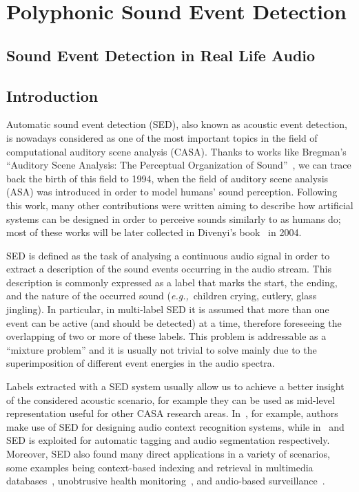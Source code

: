 \chapter{Polyphonic Sound Event Detection}
\section{Sound Event Detection in Real Life Audio}

\section{Introduction}
\label{sec:intro}


Automatic sound event detection (SED), also known as acoustic event detection, is nowadays considered as one of the most important topics in the field of computational auditory scene analysis (CASA). Thanks to works like Bregman's ``Auditory Scene Analysis: The Perceptual Organization of Sound''~\cite{bregman1994auditory}, we can trace back the birth of this field to 1994, when the field of auditory scene analysis (ASA) was introduced in order to model humans' sound perception. Following this work, many other contributions were written aiming to describe how artificial systems can be designed in order to perceive sounds similarly to as humans do; most of these works will be later collected in Divenyi's book~\cite{divenyi2004speech} in 2004.

SED is defined as the task of analysing a continuous audio signal in order to extract a description of the sound events occurring in the audio stream. This description is commonly expressed as a label that marks the start, the ending, and the nature of the occurred sound (\emph{e.g.,}\ children crying, cutlery, glass jingling). In particular, in multi-label SED it is assumed that more than one event can be active (and should be detected) at a time, therefore foreseeing the overlapping of two or more of these labels. This problem is addressable as a ``mixture problem'' and it is usually not trivial to solve mainly due to the superimposition of different event energies in the audio spectra.

Labels extracted with a SED system usually allow us to achieve a better insight of the considered acoustic scenario, for example they can be used as mid-level representation useful for other CASA research areas. In~\cite{chu2009environmental, heittola2010audio}, for example, authors make use of SED for designing audio context recognition systems, while in~\cite{shah2012lifelogging} and~\cite{wichern2010segmentation} SED is exploited for automatic tagging and audio segmentation respectively. Moreover, SED also found many direct applications in a variety of scenarios, some examples being context-based indexing and retrieval in multimedia databases~\cite{xu2008audio}, unobtrusive health monitoring~\cite{peng2009healthcare}, and audio-based surveillance~\cite{harma2005automatic, crocco2014surveillance, Principi2016a}.

